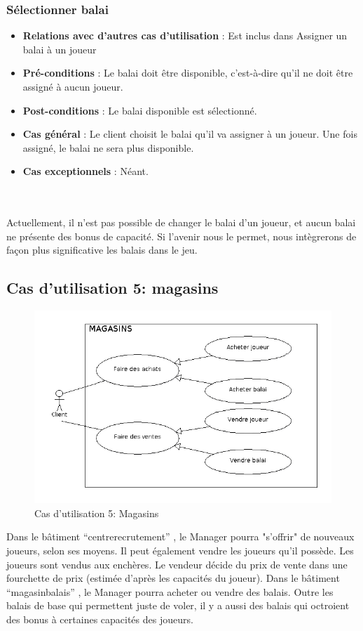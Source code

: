 \documentclass[a4paper,titlepage]{scrreprt}
\begin{document}
    \subsubsection{Sélectionner balai}
      \begin{itemize}
        \item \textbf{Relations avec d'autres cas d'utilisation}  : Est inclus dans Assigner un balai à un joueur
        \item \textbf{Pré-conditions} : Le balai doit être disponible, c’est-à-dire qu’il ne doit être assigné à aucun joueur.
        \item \textbf{Post-conditions} : Le balai disponible est sélectionné.
        \item \textbf{Cas général} : Le client choisit le balai qu’il va assigner à un joueur. Une fois assigné, le balai ne sera plus disponible.
        \item \textbf{Cas exceptionnels} : Néant.
      \end{itemize}

     \\
     \\
     Actuellement, il n'est pas possible de changer le balai d'un joueur, et aucun balai ne présente des bonus de capacité. Si l'avenir nous le permet, nous intègrerons de façon plus significative les balais dans le jeu.

  \subsection{Cas d'utilisation 5: magasins}
  \begin{figure}[H]
    \center
    \includegraphics[scale=0.5]{uml/useCaseView/Magasins.png}
    \caption{Cas d'utilisation 5: Magasins}
  \end{figure}
  Dans le bâtiment \enquote{\gls{centrerecrutement}} , le Manager pourra "s'offrir" de nouveaux joueurs, 
  selon ses moyens. Il peut également vendre les joueurs qu'il possède. Les joueurs sont vendus aux enchères. Le vendeur décide du prix de vente dans une fourchette de prix (estimée d'après les capacités du joueur).
  Dans le bâtiment \enquote{\gls{magasinbalais}} , le Manager pourra acheter ou vendre des balais. Outre les balais de base qui permettent juste de voler, 
  il y a aussi des balais qui octroient des bonus à certaines capacités des joueurs.
\end{document}
